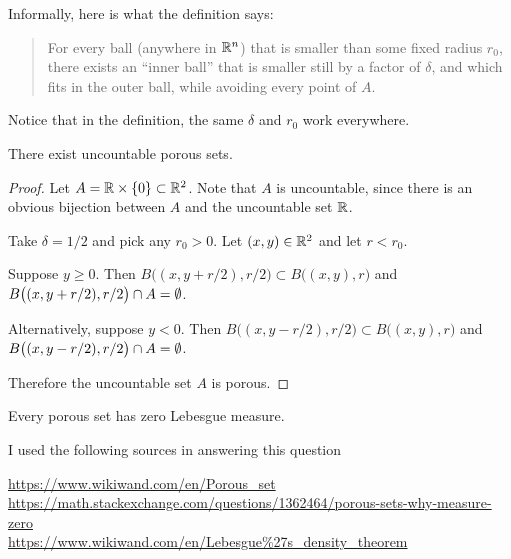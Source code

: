 Informally, here is what the definition says:

\begin{quote}
  For every ball (anywhere in $\mathbb{R}^n$) that is smaller than some fixed radius $r_0$, there exists an ``inner
  ball​'' that is smaller still by a factor of $\delta$, and which fits in the outer ball, while avoiding every
  point of $A$.
\end{quote}

Notice that in the definition, the same $\delta$ and $r_0$ work everywhere.


\begin{claim}
  There exist uncountable porous sets.
\end{claim}

\begin{proof}
  Let $A = \mathbb{R} \times \{0\} \subset \mathbb{R}^2$. Note that $A$ is uncountable, since there is an obvious bijection
  between $A$ and the uncountable set $\mathbb{R}$.

  Take $\delta = 1/2$ and pick any $r_0 > 0$. Let $(x, y) \in \mathbb{R}^2$ and let $r < r_0$.

  Suppose $y \geq 0$. Then $B\big((x, y + r/2), r/2\big) \subset B\big((x, y), r\big)$
  and $B\big((x, y + r/2), r/2\big) \cap A = \emptyset$.

  Alternatively, suppose $y < 0$. Then $B\big((x, y - r/2), r/2\big) \subset B\big((x, y), r\big)$
  and $B\big((x, y - r/2), r/2\big) \cap A = \emptyset$.

  Therefore the uncountable set $A$ is porous.
\end{proof}

\begin{claim}
  Every porous set has zero Lebesgue measure.
\end{claim}

I used the following sources in answering this question

\url{https://www.wikiwand.com/en/Porous_set}\\
\url{https://math.stackexchange.com/questions/1362464/porous-sets-why-measure-zero}\\
\url{https://www.wikiwand.com/en/Lebesgue\%27s_density_theorem}\\

